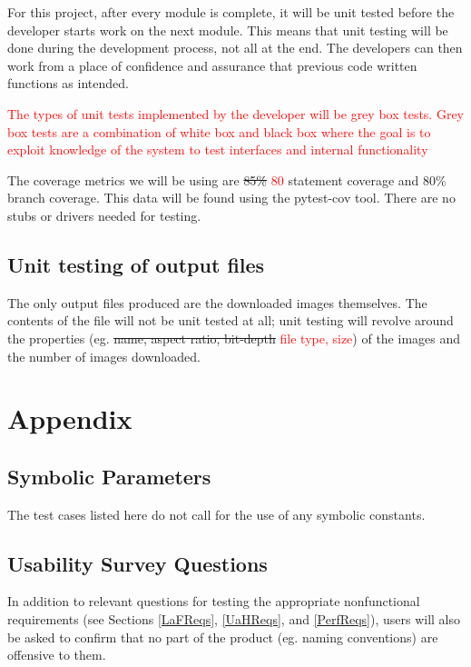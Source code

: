 \documentclass[12pt, titlepage]{article}
\begin{document}
For this project, after every module is complete, it will be unit tested before the developer starts work on the next module. This means that unit testing will be done during the development process, not all at the end. The developers can then work from a place of confidence and assurance that previous code written functions as intended.

\textcolor{red}{The types of unit tests implemented by the developer will be grey box tests. Grey box tests are a
combination of white box and black box where the goal is to exploit knowledge of the system to test interfaces and 
internal functionality}

The coverage metrics we will be using are \sout{85\%} \textcolor{red}{80} statement coverage and 
80\% branch coverage. This data will be found using the pytest-cov tool. There are no stubs 
or drivers needed for testing.
		
\subsection{Unit testing of output files}

The only output files produced are the downloaded images themselves. The contents of the file will not be unit 
tested at all; unit testing will revolve around the properties (eg. \sout{name, aspect ratio, bit-depth} \textcolor{red}{
file type, size}) of the images and the number of images downloaded.

%

%

\newpage

\section{Appendix}

\subsection{Symbolic Parameters}

The test cases listed here do not call for the use of any symbolic constants.

\subsection{Usability Survey Questions}

In addition to relevant questions for testing the appropriate nonfunctional requirements (see Sections \ref{LaFReqs}, \ref{UaHReqs}, and \ref{PerfReqs}), users will also be asked to confirm that no part of the product (eg. naming conventions) are offensive to them.
\end{document}
